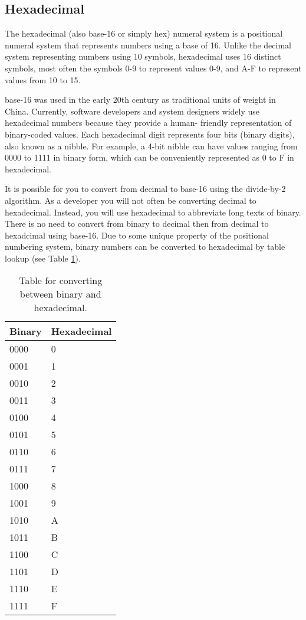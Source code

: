 \subsection{Hexadecimal\label{sec:numbers:bases:hex}}


The hexadecimal (also \gls{base-16} or simply hex) numeral system is a positional numeral system that 
represents numbers using a base of 16. Unlike the decimal system representing numbers using 10 symbols, 
hexadecimal uses 16 distinct symbols, most often the symbols 0-9 to represent values 0-9, and A-F to 
represent values from 10 to 15. 

\Gls{base-16} was used in the early 20th century as traditional units of weight in China. %
Currently, software developers and system designers widely use hexadecimal numbers because they provide a human-
friendly representation of binary-coded values. Each hexadecimal digit represents four bits (binary digits), 
also known as a \gls{nibble}. For example, a 4-bit nibble can have values ranging from 0000 to 1111 in 
binary form, which can be conveniently represented as 0 to F in hexadecimal. 


It is possible for you to convert from decimal to \gls{base-16} using the \gls{divide-by-2} algorithm. 
As a developer you will not often be converting decimal to hexadecimal. Instead, you will use 
hexadecimal to abbreviate long texts of binary. There is no need to convert from binary to decimal 
then from decimal to hexadcimal using \gls{base-16}. Due to some unique property of the positional
numbering system, binary numbers can be converted to hexadecimal by table lookup (see Table \ref{tab:hex}). 

\begin{table}[b]\centering
    \caption{Table for converting between binary and hexadecimal.\label{tab:hex}}
    \begin{tabular}{|l|l|}\hline 
        Binary & Hexadecimal \\\hline\hline  
        0000 & 0 \\\hline 
        0001 & 1\\\hline 
        0010 & 2\\\hline 
        0011 & 3\\\hline 
        0100 & 4\\\hline 
        0101 & 5\\\hline 
        0110 & 6\\\hline 
        0111 & 7\\\hline 
        1000 & 8\\\hline 
        1001 & 9\\\hline 
        1010 & A\\\hline 
        1011 & B \\\hline 
        1100 & C\\\hline 
        1101 & D\\\hline 
        1110 & E \\\hline 
        1111 & F\\\hline 
    \end{tabular}
\end{table}

